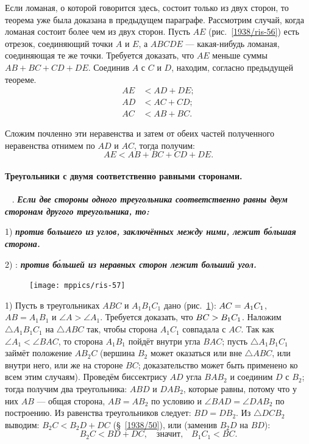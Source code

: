 \documentclass[twoside]{book}
\begin{document}
Если ломаная, о которой говорится здесь, состоит только из двух сторон, то теорема уже была доказана в предыдущем параграфе.
Рассмотрим случай, когда ломаная состоит более чем из двух сторон.
Пусть $AE$ (рис.~\ref{1938/ris-56}) есть отрезок, соединяющий точки $A$ и $E$, а $ABCDE$ — какая-нибудь ломаная, соединяющая те же точки.
Требуется доказать, что $AE$ меньше суммы $AB+BC+CD+DE$.
Соединив $A$ с $C$ и $D$, находим, согласно предыдущей теореме.
\begin{align*}
AE&<AD+DE;
\\
AD&<AC +CD;
\\
AC&<AB+BC.
\end{align*}

Сложим почленно эти неравенства и затем от обеих частей полученного неравенства отнимем по $AD$ и $AC$, тогда получим:
\[AE<AB+BC +CD + DE.\]

\paragraph{Треугольники с двумя соответственно равными сторонами.}\label{1938/52}\ 
\smallskip
{}.
\textbf{\emph{Если две стороны одного треугольника соответственно равны двум сторонам другого треугольника, то:}}

1) \textbf{\emph{против большего из углов, заключённых между ними, лежит б\'{о}льшая сторона.}}

2) :
\textbf{\emph{против б\'{о}льшей из неравных сторон лежит больший угол.}}

\begin{figure}[h!]
\centering
\texttt{[image: mppics/ris-57]}
\caption{}\label{1938/ris-57}
\end{figure}

1) Пусть в треугольниках $ABC$ и $A_1B_1C_1$ дано (рис.~\ref{1938/ris-57}):
$AC\z=A_1C_1$, $AB=A_1B_1$ и $\angle A > \angle A_1$.
Требуется доказать, что $BC\z>B_1C_1$.
Наложим $\triangle A_1B_1C_1$ на $\triangle ABC$ так, чтобы сторона $A_1C_1$ совпадала с $AC$.
Так как $\angle A_1 < \angle BAC$, то сторона $A_1B_1$ пойдёт внутри угла $BAC$;
пусть $\triangle A_1B_1C_1$ займёт положение $AB_2C$ (вершина $B_2$ может оказаться или вне $\triangle ABC$, или внутри него, или же на стороне $BC$;
доказательство может быть применено ко всем этим случаям).
Проведём биссектрису $AD$ угла $BAB_2$ и соединим $D$ с $B_2$;
тогда получим два треугольника:
$ABD$ и $DAB_2$, которые равны, потому что у них $AB$ — общая сторона, $AB=AB_2$ по условию и $\angle BAD=\angle DAB_2$ по построению.
Из равенства треугольников следует:
$BD=DB_2$.
Из $\triangle DCB_2$ выводим:
$B_2C < B_2D + DC$ (§~\ref{1938/50}), или (заменив $B_2D$ на $BD$):
\[B_2C <BD +DC,\quad\text{значит,}\quad B_1C_1 < BC.\]
\end{document}
